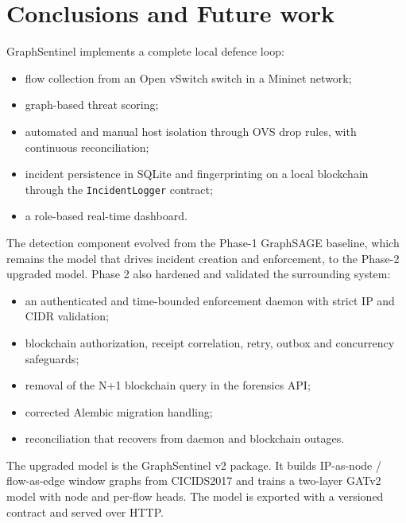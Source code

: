 \documentclass[12pt,a4paper]{report}
\begin{document}

\chapter{Conclusions and Future work}
\begin{justify}
GraphSentinel implements a complete local defence loop:
\begin{itemize}
    \item flow collection from an Open vSwitch switch in a Mininet network;
    \item graph-based threat scoring;
    \item automated and manual host isolation through OVS drop rules, with continuous reconciliation;
    \item incident persistence in SQLite and fingerprinting on a local blockchain through the \texttt{IncidentLogger} contract;
    \item a role-based real-time dashboard.
\end{itemize}
The detection component evolved from the Phase-1 GraphSAGE baseline, which remains the model that drives incident creation and enforcement, to the Phase-2 upgraded model. Phase 2 also hardened and validated the surrounding system:
\begin{itemize}
    \item an authenticated and time-bounded enforcement daemon with strict IP and CIDR validation;
    \item blockchain authorization, receipt correlation, retry, outbox and concurrency safeguards;
    \item removal of the N+1 blockchain query in the forensics API;
    \item corrected Alembic migration handling;
    \item reconciliation that recovers from daemon and blockchain outages.
\end{itemize}
The upgraded model is the GraphSentinel v2 package. It builds IP-as-node / flow-as-edge window graphs from CICIDS2017 and trains a two-layer GATv2 model with node and per-flow heads. The model is exported with a versioned contract and served over HTTP.


\end{justify}
\end{document}
